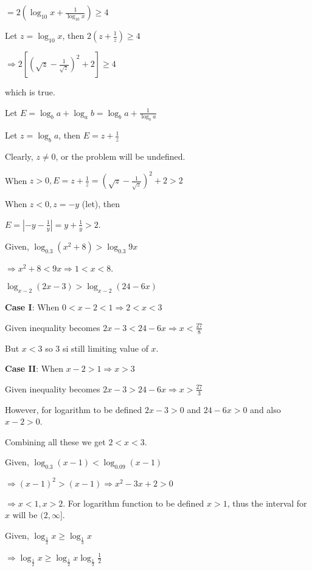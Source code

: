   $= 2\left(\log_{10}x + \frac{1}{\log_{10}x}\right)\geq 4$

  Let $z = \log_{10}x$, then $2\left(z + \frac{1}{z}\right) \geq 4$

  $\Rightarrow 2\left[\left(\sqrt{z} - \frac{1}{\sqrt{z}}\right)^2 + 2\right]\geq 4$

  which is true.
\item Let $E = \log_b a + \log_ab = \log_ba + \frac{1}{\log_ba}$

  Let $z = \log_ba$, then $E = z + \frac{1}{z}$

  Clearly, $z\neq 0$, or the problem will be undefined.

  When $z > 0, E = z + \frac{1}{z} = \left(\sqrt{z} - \frac{1}{\sqrt{z}}\right)^2 + 2 > 2$

  When $z < 0, z = -y$ (let), then

  $E = \left|- y - \frac{1}{y}\right| = y + \frac{1}{y} > 2$.
\item Given, $\log_{0.3}(x^2 + 8) > \log_{0.3}9x$

  $\Rightarrow x^2 + 8 < 9x \Rightarrow 1 < x < 8$.
\item $\log_{x - 2}(2x - 3) > \log_{x - 2}(24 - 6x)$

  {\bf Case I}: When $0 < x - 2 < 1 \Rightarrow 2 < x < 3$

  Given inequality becomes $2x - 3 < 24 - 6x \Rightarrow x < \frac{27}{8}$

  But $x < 3$ so $3$ si still limiting value of $x$.

  {\bf Case II}: When $x - 2 > 1 \Rightarrow x > 3$

  Given inequality becomes $2x - 3 > 24 - 6x \Rightarrow x > \frac{27}{3}$

  However, for logarithm to be defined $2x - 3 > 0$ and $24 - 6x > 0$ and also $x - 2 > 0$.

  Combining all these we get $2 < x < 3$.
\item Given, $\log_{0.3}(x - 1) < \log_{0.09}(x - 1)$

  $\Rightarrow (x - 1)^2 > (x - 1)\Rightarrow x^2 - 3x + 2 > 0$

  $\Rightarrow x < 1, x > 2$.
  For logarithm function to be defined $x > 1$, thus the interval for $x$ will be $(2,\infty]$.
\item Given, $\log_{\tfrac{1}{2}}x \geq \log_{\tfrac{1}{3}}x$

  $\Rightarrow \log_{\tfrac{1}{2}}x \geq \log_{\tfrac{1}{2}}x\log_{\tfrac{1}{3}}\frac{1}{2}$


